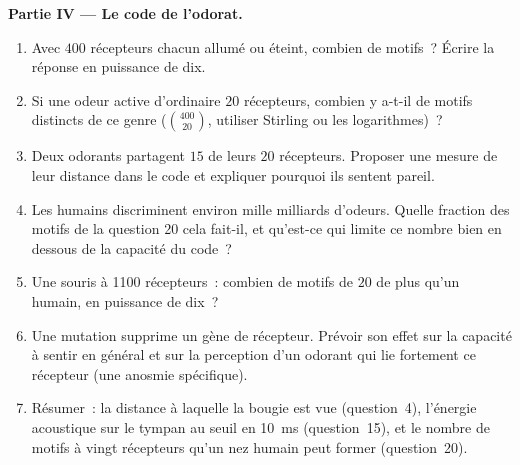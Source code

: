 \begin{problem}
\medskip
\noindent\textbf{Partie IV --- Le code de l'odorat.}
\begin{enumerate}[resume]
  \item Avec $400$ récepteurs chacun allumé ou éteint, combien de
        motifs~? Écrire la réponse en puissance de dix.
  \item Si une odeur active d'ordinaire $20$ récepteurs, combien y
        a-t-il de motifs distincts de ce genre ($\binom{400}{20}$,
        utiliser Stirling ou les logarithmes)~?
  \item Deux odorants partagent $15$ de leurs $20$ récepteurs. Proposer
        une mesure de leur distance dans le code et expliquer pourquoi
        ils sentent pareil.
  \item Les humains discriminent environ mille milliards d'odeurs.
        Quelle fraction des motifs de la question 20 cela fait-il, et
        qu'est-ce qui limite ce nombre bien en dessous de la capacité du
        code~?
  \item Une souris à \num{1100} récepteurs~: combien de motifs de $20$
        de plus qu'un humain, en puissance de dix~?
  \item Une mutation supprime un gène de récepteur. Prévoir son effet
        sur la capacité à sentir en général et sur la perception d'un
        odorant qui lie fortement ce récepteur (une anosmie spécifique).
  \item Résumer~: la distance à laquelle la bougie est vue (question~4),
        l'énergie acoustique sur le tympan au seuil en \qty{10}{ms}
        (question~15), et le nombre de motifs à vingt récepteurs qu'un
        nez humain peut former (question~20).
\end{enumerate}
\end{problem}
